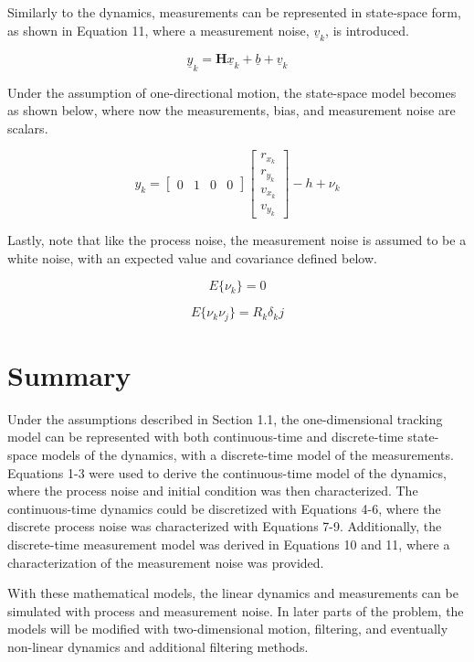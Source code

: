 \documentclass{article}
\begin{document}
Similarly to the dynamics, measurements can be represented in state-space form, as shown in Equation 11, where a measurement noise, $\underline{v}_k$, is introduced.

\begin{equation}
    \underline{y}_k = \mathbf{H}\underline{x}_k + \underline{b} + \underline{v}_k
\end{equation}

Under the assumption of one-directional motion, the state-space model becomes as shown below, where now the measurements, bias, and measurement noise are scalars.

\begin{equation*}
    y_k = 
    \begin{bmatrix}
        0 & 1 & 0 & 0
    \end{bmatrix}
    \begin{bmatrix} r_{x_k} \\r_{y_k} \\v_{x_k} \\v_{y_k} \end{bmatrix} - h + \nu_k
\end{equation*}

Lastly, note that like the process noise, the measurement noise is assumed to be a white noise, with an expected value and covariance defined below.

\begin{equation*}
    E\{\nu_k\} = 0
\end{equation*}

\begin{equation*}
    E\{\nu_k \nu_j\} = R_k\delta_kj
\end{equation*}

\section{Summary}

Under the assumptions described in Section 1.1, the one-dimensional tracking model can be represented with both continuous-time and discrete-time state-space models of the dynamics, with a discrete-time model of the measurements. Equations 1-3 were used to derive the continuous-time model of the dynamics, where the process noise and initial condition was then characterized. The continuous-time dynamics could be discretized with Equations 4-6, where the discrete process noise was characterized with Equations 7-9. Additionally, the discrete-time measurement model was derived in Equations 10 and 11, where a characterization of the measurement noise was provided.
\par
With these mathematical models, the linear dynamics and measurements can be simulated with process and measurement noise. In later parts of the problem, the models will be modified with two-dimensional motion, filtering, and eventually non-linear dynamics and additional filtering methods. 
\end{document}
